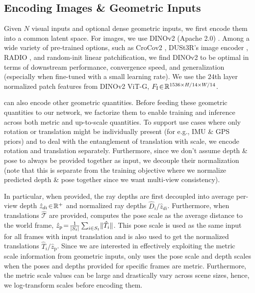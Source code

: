 \subsection{Encoding Images \& Geometric Inputs}

Given $N$ visual inputs and optional dense geometric inputs, we first encode them into a common latent space.
For images, we use DINOv2 (Apache 2.0) \cite{OquabDMVSKFHMEABGHHLMRSSXJMLJB2024}.
Among a wide variety of pre-trained options, such as CroCov2 \cite{WeinzLLCABCACR2023}, DUSt3R's image encoder \cite{WangLCCR2024}, RADIO \cite{RanziHKM2024, HeinrRHLKTCM2025}, and random-init linear patchification, we find DINOv2 to be optimal in terms of downstream performance, convergence speed, and generalization (especially when fine-tuned with a small learning rate). 
We use the $24$th layer normalized patch features from DINOv2 ViT-G, $F_\text{I} \!\in\! \mathbb{R}^{1536 \times H/14 \times W/14}$.

\coolname can also encode other geometric quantities.
Before feeding these geometric quantities to our network, we factorize them to enable training and inference across both metric and up-to-scale quantities.
To support use cases where only rotation or translation might be individually present (for e.g., IMU \& GPS priors) and to deal with the entanglement of translation with scale, we encode rotation and translation separately.
Furthermore, since we don't assume depth \& pose to always be provided together as input, we decouple their normalization (note that this is separate from the training objective where we normalize predicted depth \& pose together since we want multi-view consistency).

In particular, when provided, the ray depths are first decoupled into average per-view depth $\hat{z}_{di} \!\in\! \mathbb{R}^+$ and normalized ray depths $\hat{D}_i / \hat{z}_{di}$.
Furthermore, when translations $\hat{\mathcal{T}}$ are provided, \coolname computes the pose scale as the average distance to the world frame, %
$\hat{z}_\text{p} \!=\! \frac{1}{\left| S_t \right|} \sum_{i\in{S_t}} \lVert \hat{T}_i \rVert$.
This pose scale is used as the same input for all frames with input translation and is also used to get the normalized translations $\hat{T}_i / \hat{z}_\text{p}$.
Since we are interested in effectively exploiting the metric scale information from geometric inputs, \coolname{} only uses the pose scale and depth scales when the poses and depths provided for specific frames are metric.
Furthermore, the metric scale values can be large and drastically vary across scene sizes, hence, we log-transform scales before encoding them.

